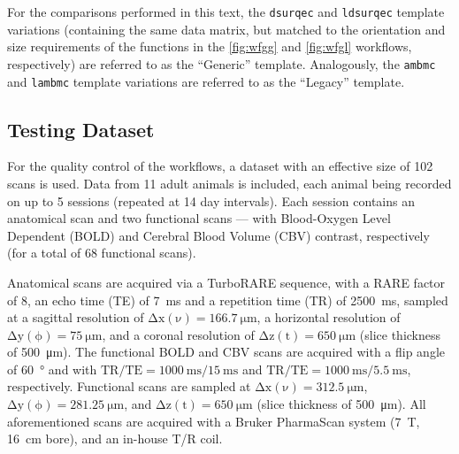 For the comparisons performed in this text, the \textcolor{mg}{\texttt{dsurqec}} and \textcolor{mg}{\texttt{ldsurqec}} template variations (containing the same data matrix, but matched to the orientation and size requirements of the functions in the \cref{fig:wfgg} and \cref{fig:wfgl} workflows, respectively) are referred to as the “Generic” template.
Analogously, the \textcolor{mg}{\texttt{ambmc}} and \textcolor{mg}{\texttt{lambmc}} template variations are referred to as the “Legacy” template.

\subsection{Testing Dataset}



For the quality control of the workflows, a dataset with an effective size of 102 scans is used.
Data from 11 adult animals is included, each animal being recorded on up to 5 sessions (repeated at 14 day intervals).
Each session contains an anatomical scan and two functional scans --- with Blood-Oxygen Level Dependent (BOLD) \cite{Ogawa1990} and Cerebral Blood Volume (CBV) \cite{Marota1999} contrast, respectively (for a total of 68 functional scans).

Anatomical scans are acquired via a TurboRARE sequence, with a RARE factor of 8, an echo time (TE) of \SI{7}{\milli\second} and a repetition time (TR) of \SI{2500}{\milli\second}, sampled at a sagittal resolution of $\mathrm{\Delta x(\nu)=\SI{166.7}{\micro\meter}}$, a horizontal resolution of $\mathrm{\Delta y(\phi)=\SI{75}{\micro\meter}}$, and a coronal resolution of $\mathrm{\Delta z(t)=\SI{650}{\micro\meter}}$ (slice thickness of \SI{500}{\micro\meter}).
The functional BOLD and CBV scans are acquired with a flip angle of \SI{60}{\degree} and with $\mathrm{TR/TE = \SI{1000}{\milli\second}/\SI{15}{\milli\second}}$ and $\mathrm{TR/TE = \SI{1000}{\milli\second}/\SI{5.5}{\milli\second}}$, respectively.
Functional scans are sampled at $\mathrm{\Delta x(\nu)=\SI{312.5}{\micro\meter}}$, $\mathrm{\Delta y(\phi)=\SI{281.25}{\micro\meter}}$, and $\mathrm{\Delta z(t)=\SI{650}{\micro\meter}}$ (slice thickness of \SI{500}{\micro\meter}).
All aforementioned scans are acquired with a Bruker PharmaScan system (\SI{7}{\tesla}, \SI{16}{\centi\meter} bore), and an in-house T/R coil.

